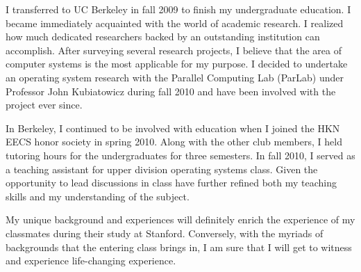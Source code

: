 \documentclass[12pt]{article}
\begin{document}
I transferred to UC Berkeley in fall 2009 to finish my undergraduate education. I became immediately acquainted with the world of academic research. I realized how much dedicated researchers backed by an outstanding institution can accomplish. After surveying several research projects, I believe that the area of computer systems is the most applicable for my purpose. I decided to undertake an operating system research with the Parallel Computing Lab (ParLab) under Professor John Kubiatowicz during fall 2010 and have been involved with the project ever since. \newline

In Berkeley, I continued to be involved with education when I joined the HKN EECS honor society in spring 2010. Along with the other club members, I held tutoring hours for the undergraduates for three semesters. In fall 2010, I served as a teaching assistant for upper division operating systems class. Given the opportunity to lead discussions in class have further refined both my teaching skills and my understanding of the subject. \newline

My unique background and experiences will definitely enrich the experience of my classmates during their study at Stanford. Conversely, with the myriads of backgrounds that the entering class brings in, I am sure that I will get to witness and experience life-changing experience. \newline
\end{document}
